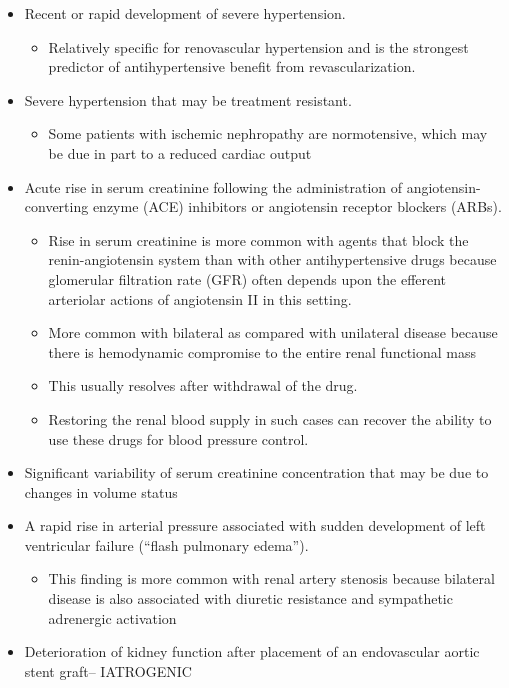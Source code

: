 \documentclass[
]{book}
\providecommand{\tightlist}{%
  \setlength{\itemsep}{0pt}\setlength{\parskip}{0pt}}
\begin{document}
\begin{itemize}
\item
  Recent or rapid development of severe hypertension.

  \begin{itemize}
  \tightlist
  \item
    Relatively specific for renovascular hypertension and is the
    strongest predictor of antihypertensive benefit from
    revascularization.
  \end{itemize}
\item
  Severe hypertension that may be treatment resistant.

  \begin{itemize}
  \tightlist
  \item
    Some patients with ischemic nephropathy are normotensive, which
    may be due in part to a reduced cardiac output
  \end{itemize}
\item
  Acute rise in serum creatinine following the administration of
  angiotensin-converting enzyme (ACE) inhibitors or angiotensin
  receptor blockers (ARBs).

  \begin{itemize}
  \item
    Rise in serum creatinine is more common with agents that block
    the renin-angiotensin system than with other antihypertensive
    drugs because glomerular filtration rate (GFR) often depends
    upon the efferent arteriolar actions of angiotensin II in this
    setting.
  \item
    More common with bilateral as compared with unilateral disease
    because there is hemodynamic compromise to the entire renal
    functional mass
  \item
    This usually resolves after withdrawal of the drug.
  \item
    Restoring the renal blood supply in such cases can recover the
    ability to use these drugs for blood pressure control.
  \end{itemize}
\item
  Significant variability of serum creatinine concentration that may
  be due to changes in volume status
\item
  A rapid rise in arterial pressure associated with sudden development
  of left ventricular failure (``flash pulmonary edema'').

  \begin{itemize}
  \tightlist
  \item
    This finding is more common with renal artery stenosis because
    bilateral disease is also associated with diuretic resistance
    and sympathetic adrenergic activation
  \end{itemize}
\item
  Deterioration of kidney function after placement of an endovascular
  aortic stent graft-- IATROGENIC


\end{itemize}
\end{document}
